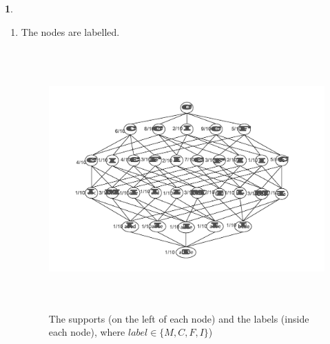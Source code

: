 \documentclass[10pt]{article}
\newtheorem{prob}{\bm{$Problem$}}
\begin{document}
\begin{prob}
\end{prob}
\begin{enumerate}[1)]
\vspace{3mm}

\item
The nodes are labelled.
\begin{figure}[H]
  \centering
  \includegraphics[width=12cm,height=10cm]{p21a.jpg}
  \caption{The supports (on the left of each node) and the labels (inside each node), where $label\in\{M,C,F,I\}$)} %
\end{figure}
\vspace{3mm}


\end{enumerate}
\end{document}

